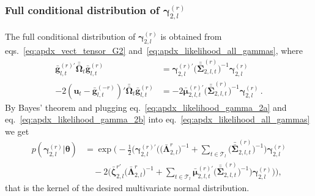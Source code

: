 \documentclass[12pt,a4paper]{article}
\theoremstyle{custom}
\begin{document}
\subsubsection{Full conditional distribution of $\boldsymbol{\gamma}_{2,l}^{(r)}$}
The full conditional distribution of $\boldsymbol{\gamma}_{2,l}^{(r)}$ is obtained from eqs.~\eqref{eq:apdx_vect_tensor_G2} and~\eqref{eq:apdx_likelihood_all_gammas}, where
\begin{align}
\label{eq:apdx_likelihood_gamma_2a}
\bar{\mathbf{g}}_{l,t}^{(r)\prime} \bar{\bar{\boldsymbol{\Omega}}}_t \bar{\mathbf{g}}_{l,t}^{(r)} & = \boldsymbol{\gamma}_{2,l}^{(r)\prime} \Big( \bar{\bar{\boldsymbol{\Sigma}}}_{2,l,t}^{(r)} \Big)^{-1} \boldsymbol{\gamma}_{2,l}^{(r)} \\
-2 (\mathbf{u}_t - \bar{\mathbf{g}}_{l,t}^{(-r)})' \bar{\bar{\boldsymbol{\Omega}}}_t \bar{\mathbf{g}}_{l,t}^{(r)} & = -2 \bar{\boldsymbol{\mu}}_{2,l,t}^{(r)\prime} \Big( \bar{\bar{\boldsymbol{\Sigma}}}_{2,l,t}^{(r)} \Big)^{-1} \boldsymbol{\gamma}_{2,l}^{(r)} \, .
\label{eq:apdx_likelihood_gamma_2b}
\end{align}
By Bayes' theorem and plugging eq.~\eqref{eq:apdx_likelihood_gamma_2a} and eq.~\eqref{eq:apdx_likelihood_gamma_2b} into eq.~\eqref{eq:apdx_likelihood_all_gammas} we get
\begin{align*}
p(\boldsymbol{\gamma}_{2,l}^{(r)} | \boldsymbol{\theta}) 
 & = \exp \Bigg( -\frac{1}{2} \Bigg( \boldsymbol{\gamma}_{2,l}^{(r)\prime} \Big( \Big( \bar{\boldsymbol{\Lambda}}_{2,l}^{r} \Big)^{-1} + \sum_{t\in\mathcal{T}_l} \Big(  \bar{\bar{\boldsymbol{\Sigma}}}_{2,l,t}^{(r)} \Big)^{-1} \Big) \boldsymbol{\gamma}_{2,l}^{(r)} \\ 
 & \quad -2 \Big( \bar{\boldsymbol{\zeta}}_{2,l}^{r'} \Big( \bar{\boldsymbol{\Lambda}}_{2,l}^{r} \Big)^{-1} + \sum_{t\in\mathcal{T}_l} \bar{\boldsymbol{\mu}}_{2,l,t}^{(r)\prime} \Big( \bar{\bar{\boldsymbol{\Sigma}}}_{2,l,t}^{(r)} \Big)^{-1} \Big) \boldsymbol{\gamma}_{2,l}^{(r)} \Bigg) \Bigg),
\end{align*}
that is the kernel of the desired multivariate normal distribution.
\end{document}
